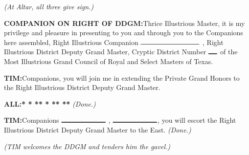 \documentclass[letterpaper]{article}
\newcommand{\hexdot}{\raisebox{0.3ex}{\textbf{{\small$\pmb{\boldsymbol{\therefore}}$}}}}
\newcommand{\smallspace}{\hspace{0.5ex}}
\newcommand{\blank}[1]{$\rule{#1ex}{1pt}$}
\newcommand{\tab}{\hspace{3ex}}
\newcommand{\knock}{\textbf{* * *\tab{}* * *\tab{}* *\tab{}*}}
\newcommand{\all}{{\color{eggplant}\textbf{ALL:}}\tab{}}
\newcommand{\comp}{{\color{eggplant}\textbf{COMPANION ON RIGHT OF DDGM:}}\tab{}}
\newcommand{\tim}{{\color{eggplant}\textbf{T\smallspace{}\hexdot{}\smallspace{}I\smallspace{}\hexdot{}\smallspace{}M\smallspace{}\hexdot{}\smallspace{}:}}\tab{}}
\begin{document}
\hspace{16ex}\textit{(At Altar, all three give sign.)} 

\comp Thrice Illustrious Master, it is my privilege and pleasure in presenting to you and through you to the Companions here assembled, Right Illustrious Companion \blank{20} , Right Illustrious District Deputy Grand Master, Cryptic District Number \blank{3} of the Most Illustrious Grand Council of Royal and Select Masters of Texas.

\tim Companions, you will join me in extending the Private Grand Honors to the Right
Illustrious District Deputy Grand Master.

\all \knock \tab{} \textit{(Done.)}

\tim Companions \blank{15} , \blank{15}, you will escort the Right Illustrious District Deputy Grand Master to the East. \textit{(Done.)}

\hspace{16ex}\textit{(T\smallspace{}\hexdot{}\smallspace{}I\smallspace{}\hexdot{}\smallspace{}M\smallspace{}\hexdot{}\smallspace{} welcomes the DDGM and tenders him the gavel.)}
\end{document}
